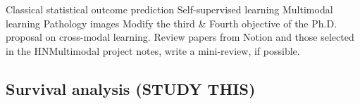 \documentclass{article}%
\begin{document}
%
Classical statistical outcome prediction%
\newline%
\newline%
%
Self{-}supervised learning%
\newline%
\newline%
%
Multimodal learning%
\newline%
\newline%
%
Pathology images %
\newline%
\newline%
%
Modify the third \& Fourth objective of the Ph.D. proposal on cross{-}modal learning. %
\newline%
\newline%
%
Review papers from Notion and those selected in the HNMultimodal project notes, write a mini{-}review, if possible.%
\newline%
\newline%
%
%
\newline%
\newline%
%
\subsection{Survival analysis (STUDY THIS)}%
\label{subsec:Survivalanalysis(STUDYTHIS)}%
\end{document}
